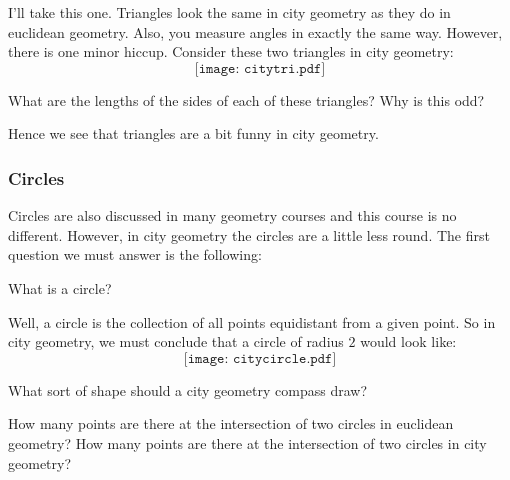 \documentclass{ximera}
\begin{document}
I'll take this one. Triangles look the same in city geometry as they
do in euclidean geometry. Also, you measure angles in exactly the same
way. However, there is one minor hiccup. Consider these two triangles
in city geometry:
\[
\texttt{[image: citytri.pdf]}
\]
\begin{question} 
What are the lengths of the sides of each of these triangles? Why is
this odd?
\end{question}
 

Hence we see that triangles are a bit funny in city geometry.

\subsubsection*{Circles}

Circles are also discussed in many geometry courses and this course is
no different. However, in city geometry the circles are a little less
round. The first question we must answer is the following:

\begin{question} What is a circle?
\end{question}

Well, a circle is the collection of all points equidistant from a
given point. So in city geometry, we must conclude that a circle of
radius $2$ would look like:
\[
\texttt{[image: citycircle.pdf]}
\]
\begin{question} What sort of shape should a city geometry compass draw?
\end{question}


\begin{question} 
How many points are there at the intersection of two circles in
euclidean geometry? How many points are there at the intersection of
two circles in city geometry?
\end{question}
\end{document}
